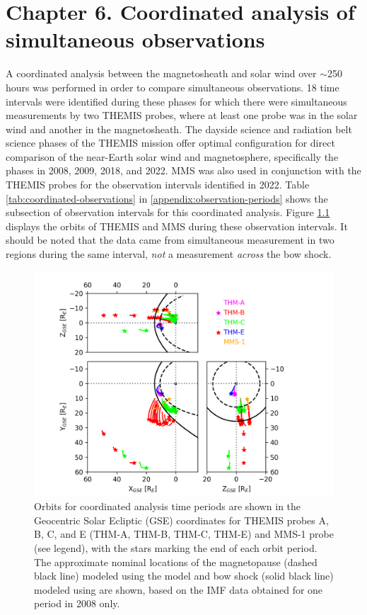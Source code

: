 \chapter{Chapter 6. Coordinated analysis of simultaneous observations}
A coordinated analysis between the magnetosheath and solar wind over $\sim$250 hours was performed in order to compare simultaneous observations. 18 time intervals were identified during these phases for which there were simultaneous measurements by two THEMIS probes, where at least one probe was in the solar wind and another in the magnetosheath. The dayside science and radiation belt science phases of the THEMIS mission offer optimal configuration for direct comparison of the near-Earth solar wind and magnetosphere, specifically the phases in 2008, 2009, 2018, and 2022. MMS was also used in conjunction with the THEMIS probes for the observation intervals identified in 2022. Table \ref{tab:coordinated-observations} in \ref{appendix:observation-periods} shows the subsection of observation intervals for this coordinated analysis. Figure \ref{fig:coordinated-orbits-plot} displays the orbits of THEMIS and MMS during these observation intervals. It should be noted that the data came from simultaneous measurement in two regions during the same interval, \textit{not} a measurement \textit{across} the bow shock.

\begin{figure}
    \centering
    \includegraphics[width=\textwidth]{Figures/Orbits/all_TE_orbits_xy_xz_yz_coordinated.png}
    \caption[Orbits for coordinated observation intervals]{Orbits for coordinated analysis time periods are shown in the Geocentric Solar Ecliptic (GSE) coordinates for THEMIS probes A, B, C, and E (THM-A, THM-B, THM-C, THM-E) and MMS-1 probe (see legend), with the stars marking the end of each orbit period. The approximate nominal locations of the magnetopause (dashed black line) modeled using the \cite{Shue:1997} model and bow shock (solid black line) modeled using \cite{SlavinHolzer:1984} are shown, based on the IMF data obtained for one period in 2008 only.}
    \label{fig:coordinated-orbits-plot}
\end{figure}

